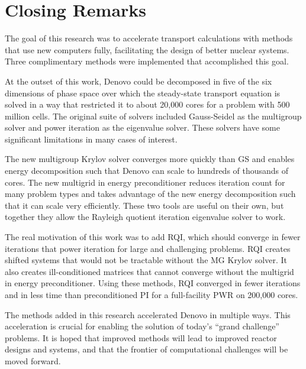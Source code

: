 \section{Closing Remarks}
The goal of this research was to accelerate transport calculations with methods that use new computers fully, facilitating the design of better nuclear systems. Three complimentary methods were implemented that accomplished this goal. 

At the outset of this work, Denovo could be decomposed in five of the six dimensions of phase space over which the steady-state transport equation is solved in a way that restricted it to about 20,000 cores for a problem with 500 million cells. The original suite of solvers included Gauss-Seidel as the multigroup solver and power iteration as the eigenvalue solver. These solvers have some significant limitations in many cases of interest. 

The new multigroup Krylov solver converges more quickly than GS and enables energy decomposition such that Denovo can scale to hundreds of thousands of cores. The new multigrid in energy preconditioner reduces iteration count for many problem types and takes advantage of the new energy decomposition such that it can scale very efficiently. These two tools are useful on their own, but together they allow the Rayleigh quotient iteration eigenvalue solver to work.

The real motivation of this work was to add RQI, which should converge in fewer iterations that power iteration for large and challenging problems. RQI creates shifted systems that would not be tractable without the MG Krylov solver. It also creates ill-conditioned matrices that cannot converge without the multigrid in energy preconditioner. Using these methods, RQI converged in fewer iterations and in less time than preconditioned PI for a full-facility PWR on 200,000 cores. 

The methods added in this research accelerated Denovo in multiple ways. This acceleration is crucial for enabling the solution of today's ``grand challenge'' problems. It is hoped that improved methods will lead to improved reactor designs and systems, and that the frontier of computational challenges will be moved forward.  


